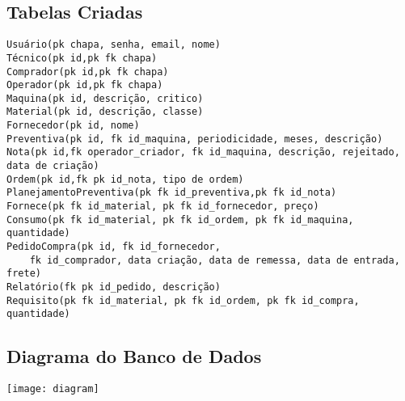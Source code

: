 \pagebreak

\subsection{Tabelas Criadas}
\begin{FlushLeft}
    \begin{verbatim}
Usuário(pk chapa, senha, email, nome) 
Técnico(pk id,pk fk chapa)
Comprador(pk id,pk fk chapa)
Operador(pk id,pk fk chapa)
Maquina(pk id, descrição, critico)
Material(pk id, descrição, classe)
Fornecedor(pk id, nome)
Preventiva(pk id, fk id_maquina, periodicidade, meses, descrição)
Nota(pk id,fk operador_criador, fk id_maquina, descrição, rejeitado, data de criação)
Ordem(pk id,fk pk id_nota, tipo de ordem)
PlanejamentoPreventiva(pk fk id_preventiva,pk fk id_nota)
Fornece(pk fk id_material, pk fk id_fornecedor, preço)
Consumo(pk fk id_material, pk fk id_ordem, pk fk id_maquina, quantidade)
PedidoCompra(pk id, fk id_fornecedor, 
    fk id_comprador, data criação, data de remessa, data de entrada, frete)
Relatório(fk pk id_pedido, descrição)
Requisito(pk fk id_material, pk fk id_ordem, pk fk id_compra, quantidade)
\end{verbatim}
\end{FlushLeft}

\subsection{Diagrama do Banco de Dados}

\texttt{[image: diagram]}


\pagebreak

